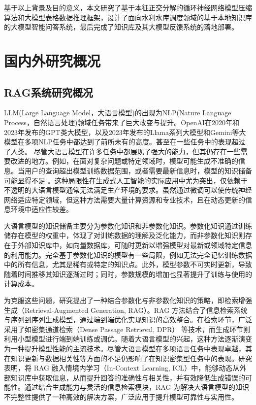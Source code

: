基于以上背景及目的意义，本文研究了基于本征正交分解的循环神经网络模型压缩算法和大模型表格数据推理框架，设计了面向水利水库调度领域的基于本地知识库的大模型智能问答系统，最后完成了知识库及其大模型反馈系统的落地部署。



\section{国内外研究概况}
\subsection{RAG系统研究概况}
LLM(Large Language Model，大语言模型)\cite{he2024annollm,weifinetuned,chen2023label,chung2024scaling,longpre2023flan}的出现为NLP(Nature Language Process，自然语言处理)领域任务带来了巨大改变与提升。OpenAI在2020年和2023年发布的GPT类大模型\cite{floridi2020gpt}，以及2023年发布的Llama\cite{touvron2023llama}系列大模型和Gemini\cite{team2023gemini}等大模型在多项NLP任务中都达到了前所未有的高度。甚至在一些任务中的表现超过了人类\cite{lu2018beyond,hendrycksmeasuring}。
尽管大语言模型在许多任务中都展现了强大的能力，但其仍存在一些需要改进的地方。例如，在面对复杂问题或特定领域时，模型可能生成不准确的信息\cite{zhang2023large}。当用户的查询超出模型训练数据范围，或者需要最新信息时，模型的知识储备可能显得不足 \cite{kandpal2023large}。这种局限性在生成式人工智能的实际应用中尤为突出，仅依赖于不透明的大语言模型通常无法满足生产环境的要求。虽然通过微调可以使传统神经网络适应特定领域，但这种方法需要大量计算资源和专业技术，且在动态更新的信息环境中适应性较差。

大语言模型的知识储备主要分为参数化知识和非参数化知识。参数化知识通过训练储存在模型的权重中，体现了对训练数据的理解及泛化能力，而非参数化知识则存在于外部知识库中，如向量数据库，可随时更新以增强模型对最新或领域特定信息的利用能力。完全基于参数化知识的模型有一些局限，例如无法完全记忆训练数据中的所有信息，尤其是稀有或特定的知识点。此外，模型参数不可实时更新，导致随着时间推移其知识逐渐过时；同时，参数规模的增加也显著提升了训练与使用的计算成本。

为克服这些问题，研究\cite{gao2023retrieval}提出了一种结合参数化与非参数化知识的策略，即检索增强生成（Retrieval-Augmented Generation, RAG）。RAG 方法结合了信息检索系统与序列到序列生成模型，通过端到端优化实现知识的高效整合。在检索环节，广泛采用了如密集通道检索（Dense Passage Retrieval, DPR）\cite{karpukhin2020dense} 等技术，而生成环节则利用小型模型进行端到端训练或调优\cite{izacard2023atlas}。随着大语言模型的兴起，这种方法逐渐演变为一种提升模型性能的主流技术。尽管大语言模型在多项语言任务中表现卓越，其在知识更新与数据相关性等方面的不足仍影响了在知识密集型任务中的表现\cite{yao2023editing,bang2023multitask}。研究\cite{he2024g}表明，将 RAG 融入情境内学习（In-Context Learning, ICL）中，能够动态从外部知识库中获取信息，从而提升回答的准确性与相关性，并有效降低生成错误的可能性。通过结合生成能力与灵活的信息检索模块，RAG 为解决大语言模型的知识不完整性提供了一种高效的解决方案，广泛应用于提升模型可靠性与实用性。

